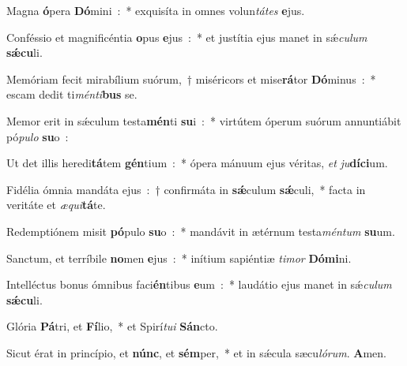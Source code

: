 ﻿\item Magna \textbf{ó}\-pera \textbf{Dó}\-mini~:~* exquisíta in omnes volun\emph{tá}\-\emph{tes} \textbf{e}\-jus.
\item Conféssio et magnificéntia \textbf{o}\-pus \textbf{e}\-jus~:~* et justítia ejus manet in sǽ\emph{cu}\-\emph{lum} \textbf{sǽ}\-\textbf{cu}\-li.
\item Memóriam fecit mirabílium suórum,~† miséricors et mise\textbf{rá}\-tor \textbf{Dó}\-minus~:~* escam dedit ti\emph{mén}\-\emph{ti}\-\textbf{bus} se.
\item Memor erit in sǽculum testa\textbf{mén}\-ti \textbf{su}\-i~:~* virtútem óperum suórum annuntiábit pó\emph{pu}\-\emph{lo} \textbf{su}\-o~:
\item Ut det illis heredi\textbf{tá}\-tem \textbf{gén}\-tium~:~* ópera mánuum ejus véritas, \emph{et} \emph{ju}\-\textbf{dí}\-\textbf{ci}\-um.
\item Fidélia ómnia mandáta ejus~:~† confirmáta in \textbf{sǽ}\-culum \textbf{sǽ}\-culi,~* facta in veritáte et \emph{æ}\-\emph{qui}\-\textbf{tá}\-te.
\item Redemptiónem misit \textbf{pó}\-pulo \textbf{su}\-o~:~* mandávit in ætérnum testa\emph{mén}\-\emph{tum} \textbf{su}\-um.
\item Sanctum, et terríbile \textbf{no}\-men \textbf{e}\-jus~:~* inítium sapiéntiæ \emph{ti}\-\emph{mor} \textbf{Dó}\-\textbf{mi}\-ni.
\item Intelléctus bonus ómnibus faci\textbf{én}\-tibus \textbf{e}\-um~:~* laudátio ejus manet in sǽ\emph{cu}\-\emph{lum} \textbf{sǽ}\-\textbf{cu}\-li.
\item Glória \textbf{Pá}\-tri, et \textbf{Fí}\-lio,~* et Spirí\emph{tu}\-\emph{i} \textbf{Sán}\-cto.
\item Sicut érat in princípio, et \textbf{núnc}, et \textbf{sém}\-per,~* et in sǽcula sæcu\emph{ló}\-\emph{rum}. \textbf{A}\-men.